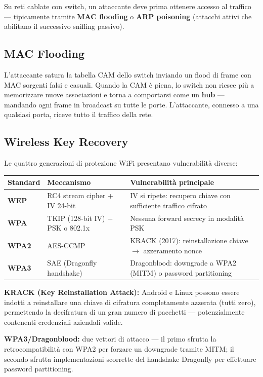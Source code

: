 \documentclass[12pt, a4paper]{report}
\begin{document}
Su reti cablate con switch, un attaccante deve prima ottenere accesso al traffico — tipicamente tramite \textbf{MAC flooding} o \textbf{ARP poisoning} (attacchi attivi che abilitano il successivo sniffing passivo).

\subsection{MAC Flooding}
L'attaccante satura la tabella CAM dello switch inviando un flood di frame con MAC sorgenti falsi e casuali. Quando la CAM è piena, lo switch non riesce più a memorizzare nuove associazioni e torna a comportarsi come un \textbf{hub} — mandando ogni frame in broadcast su tutte le porte. L'attaccante, connesso a una qualsiasi porta, riceve tutto il traffico della rete.

\subsection{Wireless Key Recovery}
Le quattro generazioni di protezione WiFi presentano vulnerabilità diverse:

\begin{table}[H]
	\centering
	\begin{tabular}{|l|l|p{6cm}|}
		\hline
		\textbf{Standard} & \textbf{Meccanismo} & \textbf{Vulnerabilità principale} \\ \hline
		\textbf{WEP} & RC4 stream cipher + IV 24-bit & IV si ripete: recupero chiave con sufficiente traffico cifrato \\ \hline
		\textbf{WPA} & TKIP (128-bit IV) + PSK o 802.1x & Nessuna forward secrecy in modalità PSK \\ \hline
		\textbf{WPA2} & AES-CCMP & KRACK (2017): reinstallazione chiave $\to$ azzeramento nonce \\ \hline
		\textbf{WPA3} & SAE (Dragonfly handshake) & Dragonblood: downgrade a WPA2 (MITM) o password partitioning \\ \hline
	\end{tabular}
\end{table}

\textbf{KRACK (Key Reinstallation Attack):} Android e Linux possono essere indotti a reinstallare una chiave di cifratura completamente azzerata (tutti zero), permettendo la decifratura di un gran numero di pacchetti — potenzialmente contenenti credenziali aziendali valide.

\textbf{WPA3/Dragonblood:} due vettori di attacco — il primo sfrutta la retrocompatibilità con WPA2 per forzare un downgrade tramite MITM; il secondo sfrutta implementazioni scorrette del handshake Dragonfly per effettuare password partitioning.
\end{document}
